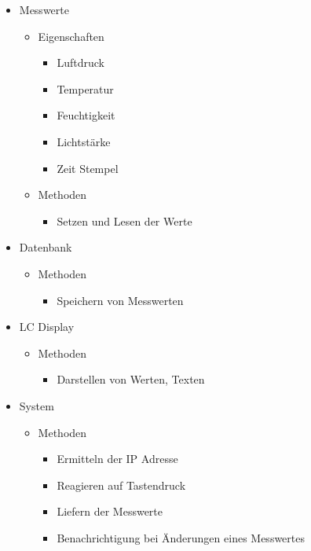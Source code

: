 \documentclass[
    10pt,
    a4paper,
]{scrartcl}
\begin{document}
\begin{itemize}
    \item Messwerte
        \begin{itemize}
            \item Eigenschaften
                \begin{itemize}
                    \item Luftdruck
                    \item Temperatur
                    \item Feuchtigkeit
                    \item Lichtstärke
                    \item Zeit Stempel
                \end{itemize}
            \item Methoden
                \begin{itemize}
                    \item Setzen und Lesen der Werte
                \end{itemize}
        \end{itemize}
    \item Datenbank
        \begin{itemize}
            \item Methoden
                \begin{itemize}
                    \item Speichern von Messwerten
                \end{itemize}
        \end{itemize}
    \item LC Display
        \begin{itemize}
            \item Methoden
                \begin{itemize}
                    \item Darstellen von Werten, Texten
                \end{itemize}
        \end{itemize}
    \item System
        \begin{itemize}
            \item Methoden
                \begin{itemize}
                    \item Ermitteln der IP Adresse
                    \item Reagieren auf Tastendruck
                    \item Liefern der Messwerte
                    \item Benachrichtigung bei Änderungen eines Messwertes
                \end{itemize}
        \end{itemize}
\end{itemize}
\end{document}
